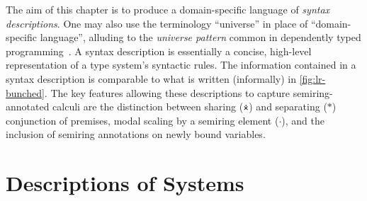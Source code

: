The aim of this chapter is to produce a domain-specific language of
\emph{syntax descriptions}.
One may also use the terminology ``universe'' in place of ``domain-specific
language'', alluding to the \emph{universe pattern} common in dependently typed
programming~\citep{BDJ03}.
A syntax description is essentially a concise, high-level representation of a
type system's syntactic rules.
The information contained in a syntax description is comparable to what is
written (informally) in \cref{fig:lr-bunched}.
The key features allowing these descriptions to capture semiring-annotated
calculi are the distinction between sharing ($\dottimes$) and separating ($*$)
conjunction of premises, modal scaling by a semiring element ($\cdot$), and the
inclusion of semiring annotations on newly bound variables.



\section{Descriptions of Systems}



